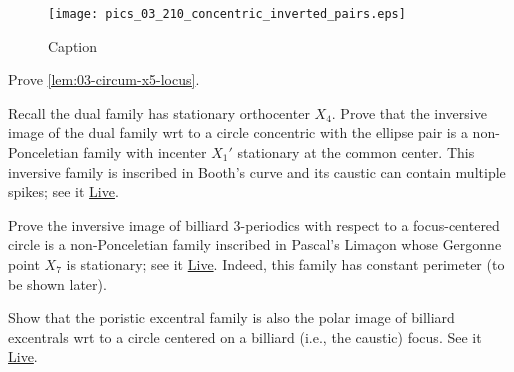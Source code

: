 \begin{figure}
    \centering
    \texttt{[image: pics\_03\_210\_concentric\_inverted\_pairs.eps]}
    \caption{Caption}
    \label{fig:03-concentric-inverted}
\end{figure}

\begin{exercise}
Prove \cref{lem:03-circum-x5-locus}.
\label{ex:03-circum-x5-locus}
\end{exercise}

\begin{exercise}
Recall the dual family has stationary orthocenter $X_4$. Prove that the inversive image of the dual family wrt to a circle concentric with the ellipse pair is a non-Ponceletian family with incenter $X_1'$ stationary at the common center. This inversive family is inscribed in Booth's curve and its caustic can contain multiple spikes; see it \href{https://bit.ly/3vCCe05}{Live}.
\end{exercise}

\begin{exercise}
Prove the inversive image of billiard 3-periodics with respect to a focus-centered circle is a non-Ponceletian family inscribed in Pascal's Limaçon whose Gergonne point $X_7$ is stationary; see it \href{https://bit.ly/3edwKD7}{Live}. Indeed, this family has constant perimeter (to be shown later).
\end{exercise}

\begin{exercise}
Show that the poristic excentral family is also the polar image of billiard excentrals wrt to a circle centered on a billiard (i.e., the caustic) focus. See it \href{https://bit.ly/33c1s9A}{Live}.
\end{exercise}